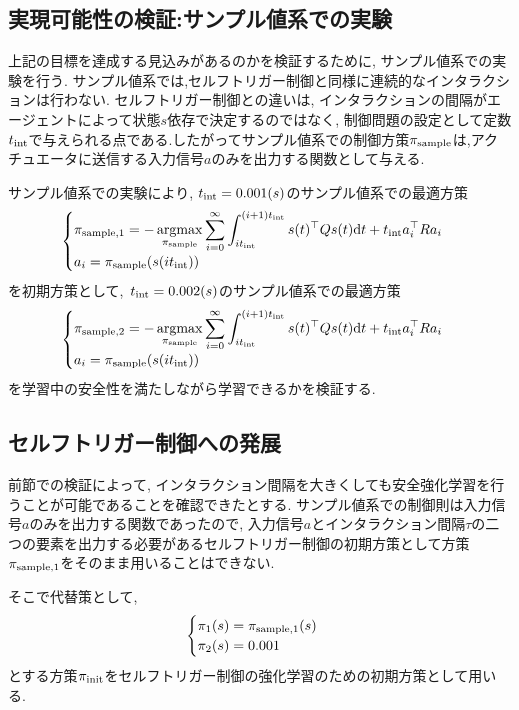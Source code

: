 \documentclass{jsarticle}
\newcommand{\argmax}{\mathop{\rm argmax}\limits}
\begin{document}
\subsection{実現可能性の検証:サンプル値系での実験}
上記の目標を達成する見込みがあるのかを検証するために, サンプル値系での実験を行う. サンプル値系では,セルフトリガー制御と同様に連続的なインタラクションは行わない. セルフトリガー制御との違いは, インタラクションの間隔がエージェントによって状態$s$依存で決定するのではなく, 制御問題の設定として定数$t_{\rm{int}}$で与えられる点である.したがってサンプル値系での制御方策$\pi_{\rm{sample}}$は,アクチュエータに送信する入力信号$a$のみを出力する関数として与える.\par
サンプル値系での実験により, $t_{\rm{int}}=0.001(s)$のサンプル値系での最適方策
\begin{align}
\begin{cases}
	\pi_{\rm{sample},1} = -\argmax_{\pi_{\rm{sample}}} \displaystyle\sum_{i=0}^{\infty} \int_{it_{\rm{int}}}^{(i+1)t_{\rm{int}}}s(t)^{\top}Qs(t)\textrm{d}t + t_{\rm{int}}a_i^{\top}Ra_i \\
	a_i  = \pi_{\rm{sample}}(s(it_{\rm{int}}))
\end{cases}
\end{align}
を初期方策として,~$t_{\rm{int}}=0.002(s)$のサンプル値系での最適方策
\begin{align}
\begin{cases}
	\pi_{\rm{sample},2} = -\argmax_{\pi_{\rm{sample}}} \displaystyle\sum_{i=0}^{\infty} \int_{it_{\rm{int}}}^{(i+1)t_{\rm{int}}}s(t)^{\top}Qs(t)\textrm{d}t + t_{\rm{int}}a_i^{\top}Ra_i  \\
	a_i  = \pi_{\rm{sample}}(s(it_{\rm{int}}))
\end{cases}
\end{align}
 を学習中の安全性を満たしながら学習できるかを検証する. 

\subsection{セルフトリガー制御への発展}
前節での検証によって, インタラクション間隔を大きくしても安全強化学習を行うことが可能であることを確認できたとする. サンプル値系での制御則は入力信号$a$のみを出力する関数であったので, 入力信号$a$とインタラクション間隔$\tau$の二つの要素を出力する必要があるセルフトリガー制御の初期方策として方策$\pi_{\rm{sample},1}$をそのまま用いることはできない. \par
そこで代替策として,
\begin{align}
\begin{cases}
	\pi_1(s)=\pi_{\rm{sample},1}(s)\\
	\pi_2(s)=0.001
\end{cases} \label{pi_init}
\end{align}
とする方策$\pi_{\rm{init}}$をセルフトリガー制御の強化学習のための初期方策として用いる.
\end{document}
